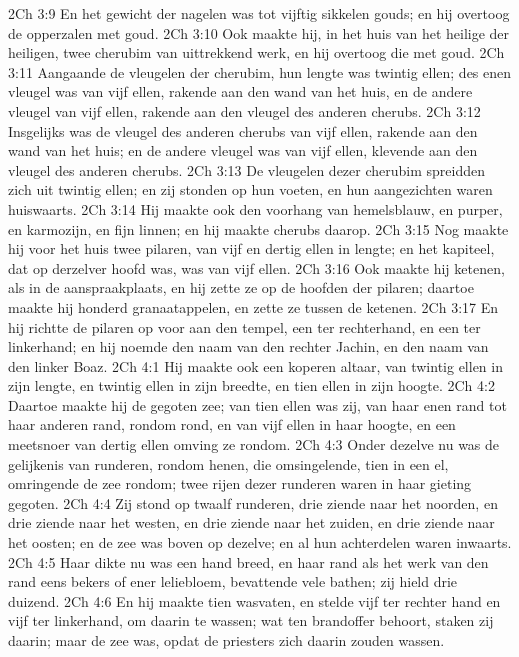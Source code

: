 2Ch 3:9  En het gewicht der nagelen was tot vijftig sikkelen gouds; en hij overtoog de opperzalen met goud.
2Ch 3:10  Ook maakte hij, in het huis van het heilige der heiligen, twee cherubim van uittrekkend werk, en hij overtoog die met goud.
2Ch 3:11  Aangaande de vleugelen der cherubim, hun lengte was twintig ellen; des enen vleugel was van vijf ellen, rakende aan den wand van het huis, en de andere vleugel van vijf ellen, rakende aan den vleugel des anderen cherubs.
2Ch 3:12  Insgelijks was de vleugel des anderen cherubs van vijf ellen, rakende aan den wand van het huis; en de andere vleugel was van vijf ellen, klevende aan den vleugel des anderen cherubs.
2Ch 3:13  De vleugelen dezer cherubim spreidden zich uit twintig ellen; en zij stonden op hun voeten, en hun aangezichten waren huiswaarts.
2Ch 3:14  Hij maakte ook den voorhang van hemelsblauw, en purper, en karmozijn, en fijn linnen; en hij maakte cherubs daarop.
2Ch 3:15  Nog maakte hij voor het huis twee pilaren, van vijf en dertig ellen in lengte; en het kapiteel, dat op derzelver hoofd was, was van vijf ellen.
2Ch 3:16  Ook maakte hij ketenen, als in de aanspraakplaats, en hij zette ze op de hoofden der pilaren; daartoe maakte hij honderd granaatappelen, en zette ze tussen de ketenen.
2Ch 3:17  En hij richtte de pilaren op voor aan den tempel, een ter rechterhand, en een ter linkerhand; en hij noemde den naam van den rechter Jachin, en den naam van den linker Boaz.
2Ch 4:1  Hij maakte ook een koperen altaar, van twintig ellen in zijn lengte, en twintig ellen in zijn breedte, en tien ellen in zijn hoogte.
2Ch 4:2  Daartoe maakte hij de gegoten zee; van tien ellen was zij, van haar enen rand tot haar anderen rand, rondom rond, en van vijf ellen in haar hoogte, en een meetsnoer van dertig ellen omving ze rondom.
2Ch 4:3  Onder dezelve nu was de gelijkenis van runderen, rondom henen, die omsingelende, tien in een el, omringende de zee rondom; twee rijen dezer runderen waren in haar gieting gegoten.
2Ch 4:4  Zij stond op twaalf runderen, drie ziende naar het noorden, en drie ziende naar het westen, en drie ziende naar het zuiden, en drie ziende naar het oosten; en de zee was boven op dezelve; en al hun achterdelen waren inwaarts.
2Ch 4:5  Haar dikte nu was een hand breed, en haar rand als het werk van den rand eens bekers of ener leliebloem, bevattende vele bathen; zij hield drie duizend.
2Ch 4:6  En hij maakte tien wasvaten, en stelde vijf ter rechter hand en vijf ter linkerhand, om daarin te wassen; wat ten brandoffer behoort, staken zij daarin; maar de zee was, opdat de priesters zich daarin zouden wassen.
